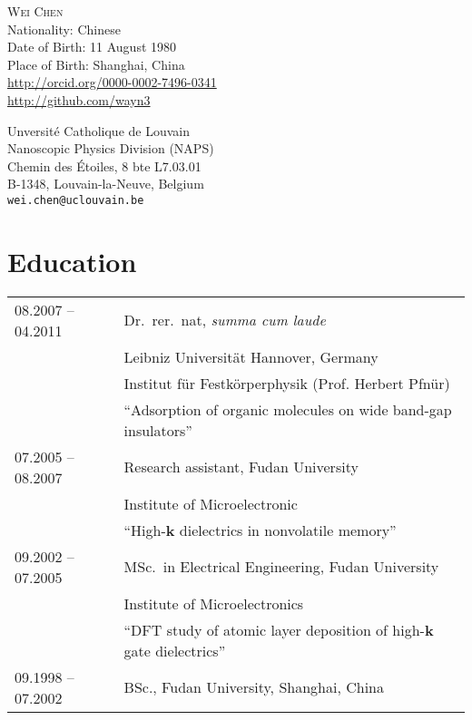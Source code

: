 \documentclass[a4paper, 11pt, DIV=15,headings=normal]{scrartcl}
\begin{document}
\begin{minipage}{0.55\linewidth}
{\Large \textsc{Wei Chen}}\\
Nationality: Chinese \\
Date of Birth: 11 August 1980 \\
Place of Birth: Shanghai, China \\
\small \url{http://orcid.org/0000-0002-7496-0341} \\
\small \url{http://github.com/wayn3}
\end{minipage}\hfill
\begin{minipage}{0.40\linewidth}
Unversit\'{e} Catholique de Louvain\\
Nanoscopic Physics Division (NAPS)\\
Chemin des \'{E}toiles, 8 bte L7.03.01 \\
B-1348, Louvain-la-Neuve, Belgium \\
\texttt{wei.chen@uclouvain.be}
\end{minipage}
\vspace{6mm}

\section*{Education}
\begin{tabular}{ll}
08.2007 -- 04.2011 & Dr.\ rer.\ nat, \emph{summa cum laude}  \\
                   & Leibniz Universit\"{a}t Hannover, Germany\\
                   & Institut f\"{u}r Festk\"{o}rperphysik (Prof. Herbert Pfn\"{u}r) \\
                   & ``Adsorption of organic molecules on wide band-gap insulators'' \\
07.2005 -- 08.2007 & Research assistant, Fudan University\\
                   & Institute of Microelectronic \\
                   & ``High-$\mathbf{k}$ dielectrics in nonvolatile memory'' \\
09.2002 -- 07.2005 & MSc.\ in Electrical Engineering, Fudan University \\
                   & Institute of Microelectronics  \\
                   & ``DFT study of atomic layer deposition of high-$\mathbf{k}$ gate dielectrics''\\
09.1998 -- 07.2002 & BSc., Fudan University, Shanghai, China
\end{tabular}
\end{document}
